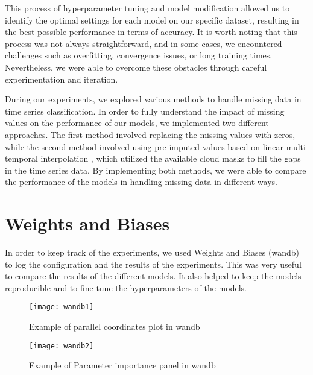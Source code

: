 This process of hyperparameter tuning and model modification allowed us to identify the optimal settings for each model on our specific dataset, resulting in the best possible performance in terms of accuracy.
It is worth noting that this process was not always straightforward, and in some cases, we encountered challenges such as overfitting, convergence issues, or long training times.
Nevertheless, we were able to overcome these obstacles through careful experimentation and iteration.

During our experiments, we explored various methods to handle missing data in time series classification. 
In order to fully understand the impact of missing values on the performance of our models, we implemented two different approaches.
The first method involved replacing the missing values with zeros, while the second method involved using pre-imputed values based on linear multi-temporal interpolation \cite{IENCO201911}, which utilized the available cloud masks to fill the gaps in the time series data. 
By implementing both methods, we were able to compare the performance of the models in handling missing data in different ways.


\section{Weights and Biases}

In order to keep track of the experiments, we used Weights and Biases\cite{wandb} (wandb) to log the configuration and the results of the experiments.
This was very useful to compare the results of the different models. It also helped to keep the models reproducible and to fine-tune the hyperparameters of the models.

\begin{figure}[H]
  \centering
  \texttt{[image: wandb1]}
  \caption{Example of parallel coordinates plot in wandb}
\end{figure}

\begin{figure}[H]
  \centering
  \texttt{[image: wandb2]}
  \caption{Example of Parameter importance panel in wandb}
\end{figure}




